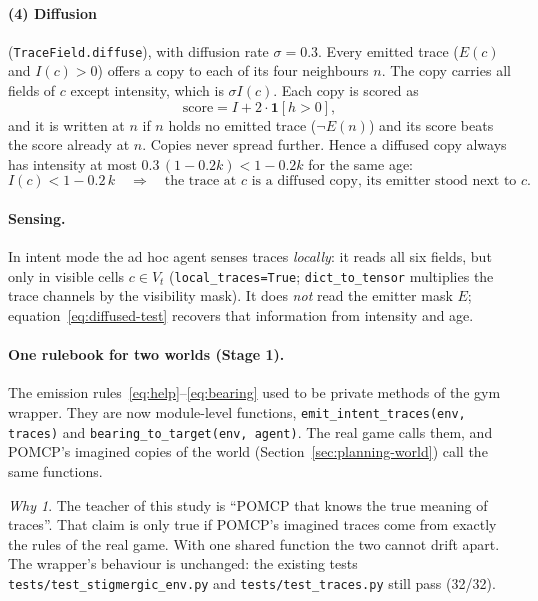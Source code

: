 \documentclass[11pt,a4paper]{article}
\newcommand{\file}{\nolinkurl}  %
\newcommand{\code}[1]{\texttt{#1}}
\theoremstyle{remark}
\newtheorem*{why}{Why}
\begin{document}
\paragraph{(4) Diffusion} (\code{TraceField.diffuse}), with diffusion rate $\sigma=0.3$. Every emitted trace ($E(c)$ and
$I(c)>0$) offers a copy to each of its four neighbours $n$. The copy carries all fields of $c$ except intensity, which is
$\sigma I(c)$. Each copy is scored as
\begin{equation}
  \text{score} = I + 2\cdot\mathbf 1[h>0],
\end{equation}
and it is written at $n$ if $n$ holds no emitted trace ($\lnot E(n)$) and its score beats the score already at $n$. Copies
never spread further. Hence a diffused copy always has intensity at most $0.3\,(1-0.2k) < 1 - 0.2k$ for the same age:
\begin{equation}
  I(c) < 1 - 0.2\,k \quad\Longrightarrow\quad \text{the trace at $c$ is a diffused copy, its emitter stood next to $c$.}
  \label{eq:diffused-test}
\end{equation}

\paragraph{Sensing.} In intent mode the ad hoc agent senses traces \emph{locally}: it reads all six fields, but only in
visible cells $c\in V_t$ (\code{local\_traces=True}; \code{dict\_to\_tensor} multiplies the trace channels by the
visibility mask). It does \emph{not} read the emitter mask $E$; equation~\eqref{eq:diffused-test} recovers that
information from intensity and age.

\paragraph{One rulebook for two worlds (Stage 1).} The emission rules~\eqref{eq:help}--\eqref{eq:bearing} used to be private
methods of the gym wrapper. They are now module-level functions, \code{emit\_intent\_traces(env, traces)} and
\code{bearing\_to\_target(env, agent)}. The real game calls them, and POMCP's imagined copies of the world
(Section~\ref{sec:planning-world}) call the same functions.
\begin{why}
The teacher of this study is ``POMCP that knows the true meaning of traces''. That claim is only true if POMCP's
imagined traces come from exactly the rules of the real game. With one shared function the two cannot drift apart. The
wrapper's behaviour is unchanged: the existing tests \file{tests/test_stigmergic_env.py} and
\file{tests/test_traces.py} still pass (32/32).
\end{why}
\end{document}
